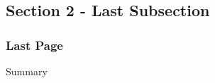 \subsection[]{Section 2 - Last Subsection}

\begin{frame}\frametitle{Last Page}
	\begin{block}{Summary}
	\end{block}
\end{frame}